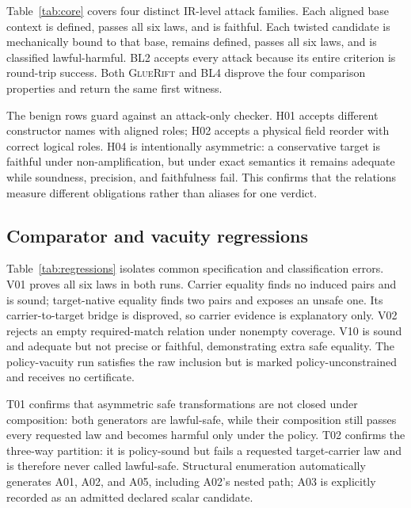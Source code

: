 \documentclass[sigconf,anonymous,review]{acmart}
\newcommand{\sys}{\textsc{GlueRift}\xspace}
\begin{document}
Table~\ref{tab:core} covers four distinct IR-level attack families.  Each
aligned base context is defined, passes all six laws, and is faithful.
Each twisted candidate is mechanically bound to that base, remains
defined, passes all six laws, and is classified lawful-harmful.  BL2
accepts every attack because its entire criterion is round-trip
success.  Both \sys and BL4 disprove the four comparison properties
and return the same first witness.

\begin{table}[t]
\caption{Core attack and benign matrix.  RT summarizes all six laws;
S/A/P/F are soundness, adequacy, precision, and faithfulness.}
\label{tab:core}
\centering
\scriptsize
\setlength{\tabcolsep}{3.2pt}

\end{table}

The benign rows guard against an attack-only checker.  H01 accepts
different constructor names with aligned roles; H02 accepts a physical
field reorder with correct logical roles.  H04 is intentionally
asymmetric: a conservative target is faithful under non-amplification,
but under exact semantics it remains adequate while soundness,
precision, and faithfulness fail.  This confirms that the relations
measure different obligations rather than aliases for one verdict.

\subsection{Comparator and vacuity regressions}

Table~\ref{tab:regressions} isolates common specification and
classification errors.  V01 proves all six laws in both runs.  Carrier
equality finds no induced pairs and is sound; target-native equality
finds two pairs and exposes an unsafe one.  Its carrier-to-target bridge
is disproved, so carrier evidence is explanatory only.  V02 rejects an
empty required-match relation under nonempty coverage.  V10 is sound
and adequate but not precise or faithful, demonstrating extra safe
equality.  The policy-vacuity run satisfies the raw inclusion but is
marked policy-unconstrained and receives no certificate.

\begin{table}[t]
\caption{Regression outcomes.}
\label{tab:regressions}
\centering
\scriptsize
\setlength{\tabcolsep}{3.3pt}

\end{table}

T01 confirms that asymmetric safe transformations are not closed under
composition: both generators are lawful-safe, while their composition
still passes every requested law and becomes harmful only under the
policy.  T02 confirms the three-way partition: it is policy-sound but
fails a requested target-carrier law and is therefore never called
lawful-safe.  Structural enumeration automatically generates A01,
A02, and A05, including A02's nested path; A03 is explicitly recorded
as an admitted declared scalar candidate.
\end{document}

